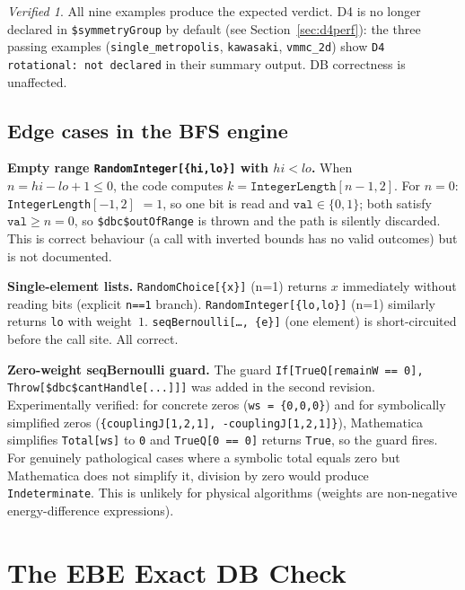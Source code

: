 \documentclass[12pt,a4paper]{article}
\theoremstyle{critical}
\theoremstyle{remark}
\theoremstyle{verified}
\newtheorem{verified}{Verified}
\begin{document}
\begin{verified}
All nine examples produce the expected verdict.  D4 is no longer declared in
\texttt{\$symmetryGroup} by default (see Section~\ref{sec:d4perf}): the three
passing examples (\texttt{single\_metropolis}, \texttt{kawasaki},
\texttt{vmmc\_2d}) show \texttt{D4 rotational: not declared} in their summary
output.  DB correctness is unaffected.
\end{verified}

\subsection{Edge cases in the BFS engine}

\noindent\textbf{Empty range \texttt{RandomInteger[\{hi,lo\}]} with $hi < lo$.}
When $n = hi - lo + 1 \leq 0$, the code computes
$k = \texttt{IntegerLength}[n-1, 2]$.  For $n = 0$: \texttt{IntegerLength}$[-1,2]$
$= 1$, so one bit is read and $\texttt{val} \in \{0,1\}$; both satisfy
$\texttt{val} \geq n = 0$, so \texttt{\$dbc\$outOfRange} is thrown and the path
is silently discarded.  This is correct behaviour (a call with inverted bounds
has no valid outcomes) but is not documented.

\noindent\textbf{Single-element lists.}
\texttt{RandomChoice[\{x\}]} (n=1) returns $x$ immediately without reading bits
(explicit \texttt{n==1} branch).  \texttt{RandomInteger[\{lo,lo\}]} (n=1)
similarly returns \texttt{lo} with weight~$1$.  \texttt{seqBernoulli[\ldots,
\{e\}]} (one element) is short-circuited before the call site.  All correct.

\noindent\textbf{Zero-weight seqBernoulli guard.}
The guard \texttt{If[TrueQ[remainW == 0], Throw[\$dbc\$cantHandle[...]]]} was
added in the second revision.  Experimentally verified: for concrete zeros
(\texttt{ws = \{0,0,0\}}) and for symbolically simplified zeros
(\texttt{\{couplingJ[1,2,1], -couplingJ[1,2,1]\}}), Mathematica simplifies
\texttt{Total[ws]} to \texttt{0} and \texttt{TrueQ[0 == 0]} returns
\texttt{True}, so the guard fires.  For genuinely pathological cases where a
symbolic total equals zero but Mathematica does not simplify it, division by
zero would produce \texttt{Indeterminate}.  This is unlikely for physical
algorithms (weights are non-negative energy-difference expressions).

\section{The EBE Exact DB Check}
\label{sec:ebe}
\end{document}
